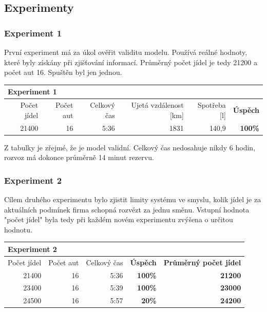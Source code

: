 \documentclass[a4paper, 11pt]{article}
\begin{document}
	\subsection{Experimenty}
	\label{sectiion:experiments}

	\subsubsection{Experiment 1}

	První experiment má za úkol ověřit validitu modelu. Používá reálné hodnoty,
	které byly získány při zjišťování informací. Průměrný počet jídel je tedy
	21200 a počet aut 16. Spuštěn byl jen jednou.

	\begin{table}[h!]
		\centering
		\begin{tabular}{|r|r|r|r|r|r|}
			\hline
			\multicolumn{6}{|l|}{\textbf{Experiment 1}}   \\ \hline
			 Počet jídel & Počet aut & Celkový čas & Ujetá vzdálenost [km] & Spotřeba [l] & \textbf{Úspěch} \\ \hline
			 21400 & 16 & 5:36 & 1831 & 140,9 & \textbf{100\%} \\ \hline
		\end{tabular}
	\end{table}

	Z tabulky je zřejmé, že je model validní. Celkový čas nedosahuje nikdy
	6 hodin, rozvoz má dokonce průměrně 14 minut rezervu.

	\subsubsection{Experiment 2}

	Cílem druhého experimentu bylo zjistit limity systému ve smyslu, kolik
	jídel je za aktuálních podmínek firma schopná rozvézt za jednu směnu.
	Vstupní hodnota "počet jídel" byla tedy při každém novém experimentu
	zvýšena o určitou hodnotu.

	\begin{table}[h!]
		\centering
		\begin{tabular}{|r|r|r|r|r|}
			\hline
			\multicolumn{5}{|l|}{\textbf{Experiment 2}}   \\ \hline
			 Počet jídel & Počet aut & Celkový čas & \textbf{Úspěch} & \textbf{Průměrný počet jídel} \\ \hline
			 21400 & 16 & 5:36 & \textbf{100\%} & \textbf{21200} \\ \hline
			 23400 & 16 & 5:39 & \textbf{100\%} & \textbf{23000} \\ \hline
			 24500 & 16 & 5:57 & \textbf{20\%}  & \textbf{24200} \\ \hline
		\end{tabular}
	\end{table}
\end{document}
